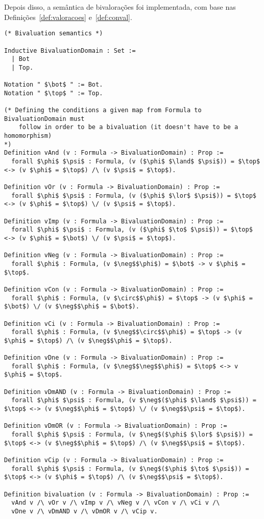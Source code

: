       Depois disso, a semântica de bivalorações foi implementada, com base nas Definições~\ref{def:valoracoes} e~\ref{def:conval}.

      \begin{lstlisting}[name=Semantics, frame=single, language=coq]
(* Bivaluation semantics *)

Inductive BivaluationDomain : Set :=
  | Bot
  | Top.

Notation " $\bot$ " := Bot.
Notation " $\top$ " := Top.

(* Defining the conditions a given map from Formula to BivaluationDomain must
    follow in order to be a bivaluation (it doesn't have to be a homomorphism)
*)
Definition vAnd (v : Formula -> BivaluationDomain) : Prop :=
  forall $\phi$ $\psi$ : Formula, (v ($\phi$ $\land$ $\psi$)) = $\top$ <-> (v $\phi$ = $\top$) /\ (v $\psi$ = $\top$).

Definition vOr (v : Formula -> BivaluationDomain) : Prop :=
  forall $\phi$ $\psi$ : Formula, (v ($\phi$ $\lor$ $\psi$)) = $\top$ <-> (v $\phi$ = $\top$) \/ (v $\psi$ = $\top$).

Definition vImp (v : Formula -> BivaluationDomain) : Prop :=
  forall $\phi$ $\psi$ : Formula, (v ($\phi$ $\to$ $\psi$)) = $\top$ <-> (v $\phi$ = $\bot$) \/ (v $\psi$ = $\top$).

Definition vNeg (v : Formula -> BivaluationDomain) : Prop :=
  forall $\phi$ : Formula, (v $\neg$$\phi$) = $\bot$ -> v $\phi$ = $\top$.

Definition vCon (v : Formula -> BivaluationDomain) : Prop :=
  forall $\phi$ : Formula, (v $\circ$$\phi$) = $\top$ -> (v $\phi$ = $\bot$) \/ (v $\neg$$\phi$ = $\bot$).

Definition vCi (v : Formula -> BivaluationDomain) : Prop :=
  forall $\phi$ : Formula, (v $\neg$$\circ$$\phi$) = $\top$ -> (v $\phi$ = $\top$) /\ (v $\neg$$\phi$ = $\top$).

Definition vDne (v : Formula -> BivaluationDomain) : Prop :=
  forall $\phi$ : Formula, (v $\neg$$\neg$$\phi$) = $\top$ <-> v $\phi$ = $\top$.

Definition vDmAND (v : Formula -> BivaluationDomain) : Prop :=
  forall $\phi$ $\psi$ : Formula, (v $\neg$($\phi$ $\land$ $\psi$)) = $\top$ <-> (v $\neg$$\phi$ = $\top$) \/ (v $\neg$$\psi$ = $\top$).

Definition vDmOR (v : Formula -> BivaluationDomain) : Prop :=
  forall $\phi$ $\psi$ : Formula, (v $\neg$($\phi$ $\lor$ $\psi$)) = $\top$ <-> (v $\neg$$\phi$ = $\top$) /\ (v $\neg$$\psi$ = $\top$).

Definition vCip (v : Formula -> BivaluationDomain) : Prop :=
  forall $\phi$ $\psi$ : Formula, (v $\neg$($\phi$ $\to$ $\psi$)) = $\top$ <-> (v $\phi$ = $\top$) /\ (v $\neg$$\psi$ = $\top$).
  
Definition bivaluation (v : Formula -> BivaluationDomain) : Prop :=
  vAnd v /\ vOr v /\ vImp v /\ vNeg v /\ vCon v /\ vCi v /\
  vDne v /\ vDmAND v /\ vDmOR v /\ vCip v.
              \end{lstlisting}

